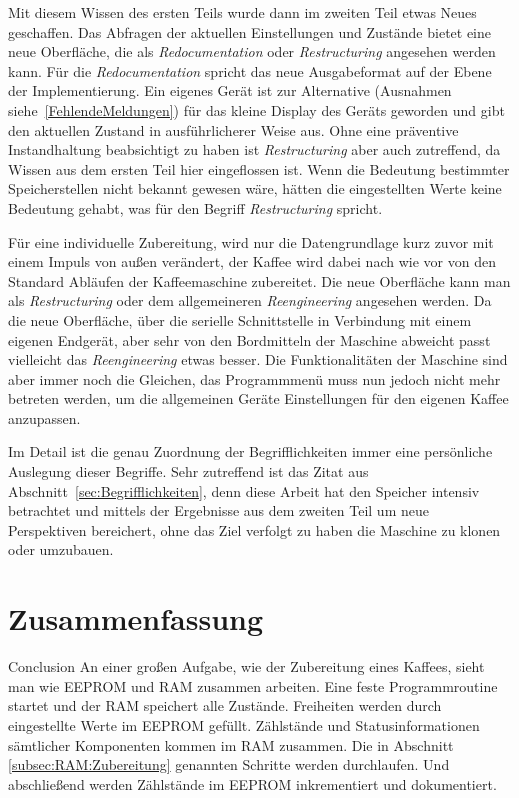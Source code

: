 Mit diesem Wissen des ersten Teils wurde dann im zweiten Teil etwas Neues geschaffen.
Das Abfragen der aktuellen Einstellungen und Zustände bietet eine neue Oberfläche, die als \textit{Redocumentation} oder \textit{Restructuring} angesehen werden kann.
Für die \textit{Redocumentation} spricht das neue Ausgabeformat auf der Ebene der Implementierung.
Ein eigenes Gerät ist zur Alternative (Ausnahmen siehe~\ref{FehlendeMeldungen}) für das kleine Display des Geräts geworden und gibt den aktuellen Zustand in ausführlicherer Weise aus.
Ohne eine präventive Instandhaltung beabsichtigt zu haben ist \textit{Restructuring} aber auch zutreffend, da Wissen aus dem ersten Teil hier eingeflossen ist.
Wenn die Bedeutung bestimmter Speicherstellen nicht bekannt gewesen wäre, hätten die eingestellten Werte keine Bedeutung gehabt, was für den Begriff \textit{Restructuring} spricht.

Für eine individuelle Zubereitung, wird nur die Datengrundlage kurz zuvor mit einem Impuls von außen verändert, der Kaffee wird dabei nach wie vor von den Standard Abläufen der Kaffeemaschine zubereitet.
Die neue Oberfläche kann man als \textit{Restructuring} oder dem allgemeineren \textit{Reengineering} angesehen werden.
Da die neue Oberfläche, über die serielle Schnittstelle in Verbindung mit einem eigenen Endgerät, aber sehr von den Bordmitteln der Maschine abweicht passt vielleicht das \textit{Reengineering} etwas besser.
Die Funktionalitäten der Maschine sind aber immer noch die Gleichen, das Programmmenü muss nun jedoch nicht mehr betreten werden, um die allgemeinen Geräte Einstellungen für den eigenen Kaffee anzupassen.

Im Detail ist die genau Zuordnung der Begrifflichkeiten immer eine persönliche Auslegung dieser Begriffe.
Sehr zutreffend ist das Zitat aus Abschnitt~\ref{sec:Begrifflichkeiten}, denn diese Arbeit hat den Speicher intensiv betrachtet und mittels der Ergebnisse aus dem zweiten Teil um neue Perspektiven bereichert, ohne das Ziel verfolgt zu haben die Maschine zu klonen oder umzubauen.

\section{Zusammenfassung}\todo
Conclusion \todo
An einer großen Aufgabe, wie der Zubereitung eines Kaffees, sieht man wie \ac{EEPROM} und \ac{RAM} zusammen arbeiten.
Eine feste Programmroutine startet und der \ac{RAM} speichert alle Zustände.
Freiheiten werden durch eingestellte Werte im \ac{EEPROM} gefüllt.
Zählstände und Statusinformationen sämtlicher Komponenten kommen im \ac{RAM} zusammen.
Die in Abschnitt \ref{subsec:RAM:Zubereitung} genannten Schritte werden durchlaufen.
Und abschließend werden Zählstände im \ac{EEPROM} inkrementiert und dokumentiert.

